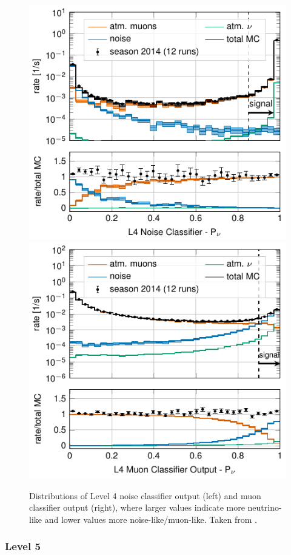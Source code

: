 \begin{figure}
\centering 
\includegraphics[width=0.49\linewidth]{figures/simulation_and_processing/selection/l4_noise_classifier_probnu.pdf}
\includegraphics[width=0.49\linewidth]{figures/simulation_and_processing/selection/l4_muon_classifier_probnu.pdf}

\caption[Level 4 classifier outputs (muon and noise)]{Distributions of Level 4 noise classifier output (left) and muon classifier output (right), where larger values indicate more neutrino-like and lower values more noise-like/muon-like. Taken from \cite{OVS_PRD}.}
\end{figure}


\subsubsection{Level 5} 

